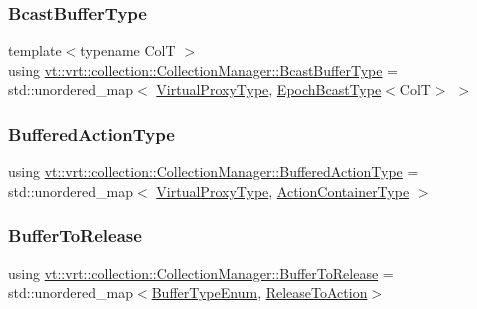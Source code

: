 \subsubsection{\texorpdfstring{Bcast\+Buffer\+Type}{BcastBufferType}}
{\footnotesize\ttfamily template$<$typename ColT $>$ \\
using \hyperlink{structvt_1_1vrt_1_1collection_1_1_collection_manager_af3a8c8a3c37301a98aa62f265858a3c0}{vt\+::vrt\+::collection\+::\+Collection\+Manager\+::\+Bcast\+Buffer\+Type} =  std\+::unordered\+\_\+map$<$ \hyperlink{namespacevt_a1b417dd5d684f045bb58a0ede70045ac}{Virtual\+Proxy\+Type}, \hyperlink{structvt_1_1vrt_1_1collection_1_1_collection_manager_ade4647c26f1f20016fa0520bea640f59}{Epoch\+Bcast\+Type}$<$ColT$>$ $>$}

\mbox{\label{structvt_1_1vrt_1_1collection_1_1_collection_manager_a7b32db0e6ccafa771ddd72f534a1cf8c}} 
\subsubsection{\texorpdfstring{Buffered\+Action\+Type}{BufferedActionType}}
{\footnotesize\ttfamily using \hyperlink{structvt_1_1vrt_1_1collection_1_1_collection_manager_a7b32db0e6ccafa771ddd72f534a1cf8c}{vt\+::vrt\+::collection\+::\+Collection\+Manager\+::\+Buffered\+Action\+Type} =  std\+::unordered\+\_\+map$<$ \hyperlink{namespacevt_a1b417dd5d684f045bb58a0ede70045ac}{Virtual\+Proxy\+Type}, \hyperlink{structvt_1_1vrt_1_1collection_1_1_collection_manager_a536805fb5c58b557b66e7d7febe87567}{Action\+Container\+Type} $>$}

\mbox{\label{structvt_1_1vrt_1_1collection_1_1_collection_manager_a47d2def9bdf4fb84026c615602779053}} 
\subsubsection{\texorpdfstring{Buffer\+To\+Release}{BufferToRelease}}
{\footnotesize\ttfamily using \hyperlink{structvt_1_1vrt_1_1collection_1_1_collection_manager_a47d2def9bdf4fb84026c615602779053}{vt\+::vrt\+::collection\+::\+Collection\+Manager\+::\+Buffer\+To\+Release} =  std\+::unordered\+\_\+map$<$\hyperlink{namespacevt_1_1vrt_1_1collection_a1b1b082e2ff4e9e5d1b7227acd78db3f}{Buffer\+Type\+Enum}, \hyperlink{structvt_1_1vrt_1_1collection_1_1_collection_manager_abf98645da5d52c568fae8ed6f11ab82f}{Release\+To\+Action}$>$\hspace{0.3cm}{\ttfamily [private]}}


